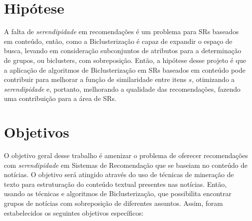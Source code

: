 \documentclass[normaltoc, espacoumemeio, pnumromarab,ruledheader]{abnt}
\begin{document}


\section{Hipótese}


A falta de \textit{serendipidade} em recomendações é um problema para SRs baseados em conteúdo, então, como a Biclusterização é capaz de expandir o espaço de busca, levando em consideração subconjuntos de atributos para a determinação de grupos, ou biclusters, com sobreposição. Então, a hipótese desse projeto é que a aplicação de algoritmos de Biclusterização em SRs baseados em conteúdo pode contribuir para melhorar a função de similaridade entre itens $s$, otimizando a \textit{serendipidade} e, portanto, melhorando a qualidade das recomendações, fazendo uma contribuição para a área de SRs.

\section{Objetivos}

O objetivo geral desse trabalho é amenizar o problema de oferecer recomendações com \textit{serendipidade} em Sistemas de Recomendação que se baseiam no conteúdo de notícias.
O objetivo será atingido através do uso de técnicas de mineração de texto para estruturação do conteúdo textual presentes nas notícias.
Então, usando as técnicas e algoritmos de Biclusterização, que possibilita encontrar grupos de notícias com sobreposição de diferentes assuntos.
Assim, foram estabelecidos os seguintes objetivos específicos:
\end{document}
